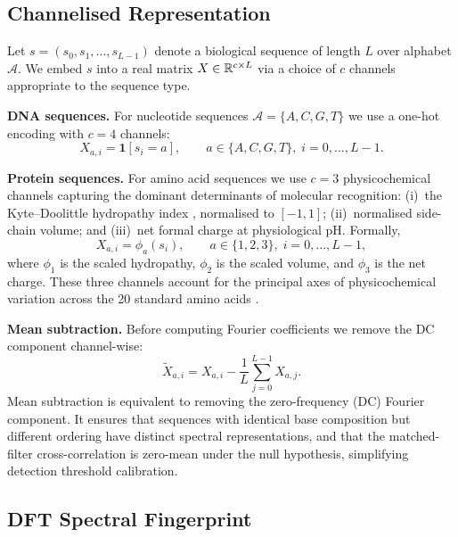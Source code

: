 \subsection{Channelised Representation}

Let $s = (s_0, s_1, \ldots, s_{L-1})$ denote a biological sequence of length
$L$ over alphabet $\mathcal{A}$. We embed $s$ into a real matrix
$X \in \mathbb{R}^{c \times L}$ via a choice of $c$ channels appropriate to the
sequence type.

\medskip\noindent\textbf{DNA sequences.} For nucleotide sequences
$\mathcal{A} = \{A, C, G, T\}$ we use a one-hot encoding with $c = 4$
channels:
\begin{equation}
  X_{a,i} = \mathbf{1}[s_i = a], \qquad a \in \{A, C, G, T\},\; i = 0,\ldots,L-1.
  \label{ps:eq:onehot}
\end{equation}

\noindent\textbf{Protein sequences.} For amino acid sequences we use $c = 3$
physicochemical channels capturing the dominant determinants of molecular
recognition: (i)~the Kyte--Doolittle hydropathy index \citep{kyte1982},
normalised to $[-1,1]$; (ii)~normalised side-chain volume; and (iii)~net formal
charge at physiological pH. Formally,
\begin{equation}
  X_{a,i} = \phi_a(s_i), \qquad a \in \{1, 2, 3\},\; i = 0,\ldots,L-1,
  \label{ps:eq:protchan}
\end{equation}
where $\phi_1$ is the scaled hydropathy, $\phi_2$ is the scaled volume, and
$\phi_3$ is the net charge. These three channels account for the principal axes
of physicochemical variation across the 20 standard amino acids \citep{kyte1982}.

\medskip\noindent\textbf{Mean subtraction.} Before computing Fourier
coefficients we remove the DC component channel-wise:
\begin{equation}
  \widetilde{X}_{a,i} = X_{a,i} - \frac{1}{L}\sum_{j=0}^{L-1} X_{a,j}.
  \label{ps:eq:mean_sub}
\end{equation}
Mean subtraction is equivalent to removing the zero-frequency (DC) Fourier
component. It ensures that sequences with identical base composition but
different ordering have distinct spectral representations, and that the
matched-filter cross-correlation is zero-mean under the null hypothesis,
simplifying detection threshold calibration.

\subsection{DFT Spectral Fingerprint}

